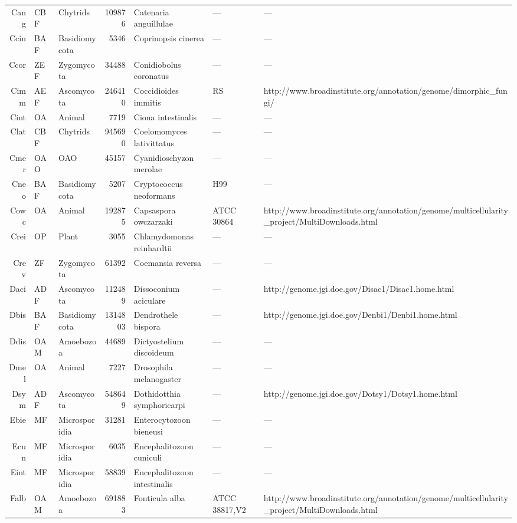 {\begin{table}[tbp]
\begin{tabular}{rllrlll}
  Cang & CBF & Chytrids & 109876 & Catenaria anguillulae & --- & --- \\ 
  Ccin & BAF & Basidiomycota & 5346 & Coprinopsis cinerea & --- & --- \\ 
  Ccor & ZEF & Zygomycota & 34488 & Conidiobolus coronatus & --- & --- \\ 
  Cimm & AEF & Ascomycota & 246410 & Coccidioides immitis & RS & http://www.broadinstitute.org/annotation/genome/dimorphic\_fungi/ \\ 
  Cint & OA & Animal & 7719 & Ciona intestinalis & --- & --- \\ 
  Clat & CBF & Chytrids & 945690 & Coelomomyces lativittatus & --- & --- \\ 
  Cmer & OAO & OAO & 45157 & Cyanidioschyzon merolae & --- & --- \\ 
  Cneo & BAF & Basidiomycota & 5207 & Cryptococcus neoformans & H99 & --- \\ 
  Cowc & OA & Animal & 192875 & Capsaspora owczarzaki & ATCC 30864 & http://www.broadinstitute.org/annotation/genome/multicellularity\_project/MultiDownloads.html \\ 
  Crei & OP & Plant & 3055 & Chlamydomonas reinhardtii & --- & --- \\ 
  Crev & ZF & Zygomycota & 61392 & Coemansia reversa & --- & --- \\ 
  Daci & ADF & Ascomycota & 112489 & Dissoconium aciculare & --- & http://genome.jgi.doe.gov/Disac1/Disac1.home.html \\ 
  Dbis & BAF & Basidiomycota & 1314803 & Dendrothele bispora & --- & http://genome.jgi.doe.gov/Denbi1/Denbi1.home.html \\ 
  Ddis & OAM & Amoebozoa & 44689 & Dictyostelium discoideum & --- & --- \\ 
  Dmel & OA & Animal & 7227 & Drosophila melanogaster & --- & --- \\ 
  Dsym & ADF & Ascomycota & 548649 & Dothidotthia symphoricarpi & --- & http://genome.jgi.doe.gov/Dotsy1/Dotsy1.home.html \\ 
  Ebie & MF & Microsporidia & 31281 & Enterocytozoon bieneusi & --- & --- \\ 
  Ecun & MF & Microsporidia & 6035 & Encephalitozoon cuniculi & --- & --- \\ 
  Eint & MF & Microsporidia & 58839 & Encephalitozoon intestinalis & --- & --- \\ 
  Falb & OAM & Amoebozoa & 691883 & Fonticula alba & ATCC 38817,V2 & http://www.broadinstitute.org/annotation/genome/multicellularity\_project/MultiDownloads.html \\ 

\end{tabular}
\end{table}}
